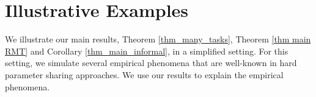 \section{Illustrative Examples}\label{sec_special}


We illustrate our main results, Theorem \ref{thm_many_tasks}, Theorem \ref{thm main RMT} and Corollary \ref{thm_main_informal}, in a simplified setting.
For this setting, we simulate several empirical phenomena that are well-known in hard parameter sharing approaches.
We use our results to explain the empirical phenomena.




